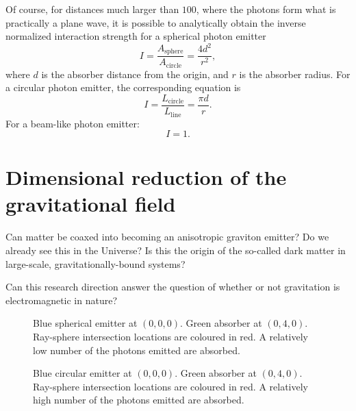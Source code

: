 \documentclass[12pt]{article}
\begin{document}
Of course, for distances much larger than $100$, where the photons form what is practically a plane wave, it is possible to analytically obtain the inverse normalized interaction strength for a spherical photon emitter
\begin{equation}
I = \frac{ A_{{\textrm{sphere}}} }{ A_{{\textrm{circle}}} } = \frac{4 d^2}{r^2},
\end{equation}
where $d$ is the absorber distance from the origin, and $r$ is the absorber radius.
For a circular photon emitter, the corresponding equation is
\begin{equation}
I =  \frac{ L_{{\textrm{circle}}} }{ L_{{\textrm{line}}} }  =  \frac{\pi d}{r}.
\end{equation}
For a beam-like photon emitter:
\begin{equation}
I = 1.
\end{equation}

\section{Dimensional reduction of the gravitational field}

Can matter be coaxed into becoming an anisotropic graviton emitter?
Do we already see this in the Universe?
Is this the origin of the so-called dark matter in large-scale, gravitationally-bound systems?

Can this research direction answer the question of whether or not gravitation is electromagnetic in nature?





\pagebreak





\begin{figure} 
\centering
{}
  \caption{
Blue spherical emitter at $(0, 0, 0)$. 
Green absorber at $(0, 4, 0)$. 
Ray-sphere intersection locations are coloured in red.
A relatively low number of the photons emitted are absorbed.
}
\end{figure}


\begin{figure} 
\centering
{}
  \caption{
Blue circular emitter at $(0, 0, 0)$. 
Green absorber at $(0, 4, 0)$. 
Ray-sphere intersection locations are coloured in red.
A relatively high number of the photons emitted are absorbed.
}
\end{figure}
\end{document}
